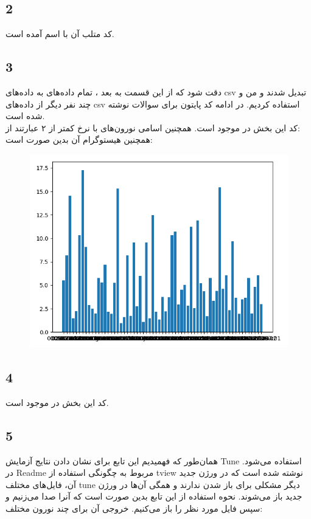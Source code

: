 \documentclass[12 pt]{article}
\begin{document}
\subsection*{2}
کد متلب آن با اسم 
آمده است.
\subsection*{3}
دقت شود که از این قسمت به بعد ، تمام داده‌های 
به داده‌های csv تبدیل شدند و من و چند نفر دیگر از داده‌های csv استفاده کردیم. در ادامه کد پایتون برای سوالات نوشته شده است.\\
کد این بخش در 
موجود است. همچنین اسامی نورون‌های با نرخ کمتر از ۲ عبارتند از:
\\
همچنین هیستوگرام آن بدین صورت است:
		\begin{figure}[H]
	\centering
	\includegraphics[height=0.5\linewidth, width = 0.7\linewidth]{c.png}
\end{figure}
\subsection*{4}
کد این بخش در 
موجود است.
\subsection*{5}
همان‌طور که فهمیدیم این تابع برای نشان دادن نتایج آزمایش Tune استفاده می‌شود.
در Readme مربوط به چگونگی استفاده از tview نوشته شده است که در ورژن جدید آن، فایل‌های مختلف tune دیگر مشکلی برای باز شدن ندارند و همگی آن‌ها در ورژن جدید باز می‌شوند. نحوه استفاده از این تابع بدین صورت است که آنرا صدا می‌زنیم و سپس فایل مورد نظر را باز می‌کنیم. خروجی آن برای چند نورون مختلف:
\end{document}
